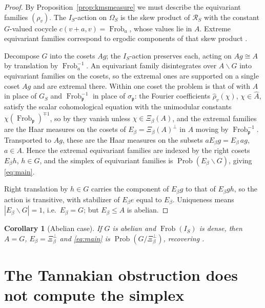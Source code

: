 \documentclass[11pt]{amsart}
\numberwithin{equation}{section}
\newtheorem{corollary}[theorem]{Corollary}
\theoremstyle{definition}
\theoremstyle{remark}
\newcommand{\cR}{\mathcal{R}}
\newcommand{\pp}{\mathfrak{p}}
\newcommand{\Frob}{\operatorname{Frob}}
\newcommand{\Prob}{\operatorname{Prob}}
\begin{document}
\begin{proof}
By Proposition~\ref{prop:kmsmeasure} we must describe the equivariant families $(\rho_v)$.
The $I_S$-action on $\Omega_S$ is the skew product of $\cR_S$ with the constant $G$-valued
cocycle $c(v+a,v)=\Frob_a$, whose values lie in $A$. Extreme equivariant families correspond
to ergodic components of that skew product \cite{FM}.

Decompose $G$ into the cosets $Ag$; the $I_S$-action preserves each, acting on
$Ag\cong A$ by translation by $\Frob_a^{-1}$. An equivariant family disintegrates over
$A\backslash G$ into equivariant families on the cosets, so the extremal ones are
supported on a single coset $Ag$ and are extremal there. Within one coset the problem is
that of \cite[Thm.~3.6]{Main} with $A$ in place of $G_S$ and $\Frob_\pp^{-1}$ in place of
$\sigma_\pp$: the Fourier coefficients $\hat\rho_v(\chi)$, $\chi\in\widehat A$, satisfy the
scalar cohomological equation with the unimodular constants $\chi(\Frob_\pp)^{\mp1}$, so
by \cite[Lem.~3.1, Props.~3.3, 3.4]{Main} they vanish unless $\chi\in\Xi_\beta(A)$, and the
extremal families are the Haar measures on the cosets of $E_\beta=\Xi_\beta(A)^\perp$ in
$A$ moving by $\Frob_\pp^{-1}$. Transported to $Ag$, these are the Haar measures on the
subsets $aE_\beta g=E_\beta\,ag$, $a\in A$. Hence the extremal equivariant families are
indexed by the right cosets $E_\beta h$, $h\in G$, and the simplex of equivariant families
is $\Prob(E_\beta\backslash G)$, giving \eqref{eq:main}.

Right translation by $h\in G$ carries the component of $E_\beta g$ to that of $E_\beta gh$,
so the action is transitive, with stabilizer of $E_\beta e$ equal to $E_\beta$. Uniqueness
means $|E_\beta\backslash G|=1$, i.e.\ $E_\beta=G$; but $E_\beta\le A$ is abelian.
\end{proof}

\begin{corollary}[Abelian case]\label{cor:abelian}
If $G$ is abelian and $\Frob(I_S)$ is dense, then $A=G$, $E_\beta=\Xi_\beta^\perp$ and
\eqref{eq:main} is $\Prob(G/\Xi_\beta^\perp)$, recovering \cite[Thm.~3.6]{Main}.
\end{corollary}

\section{The Tannakian obstruction does not compute the simplex}
\end{document}
